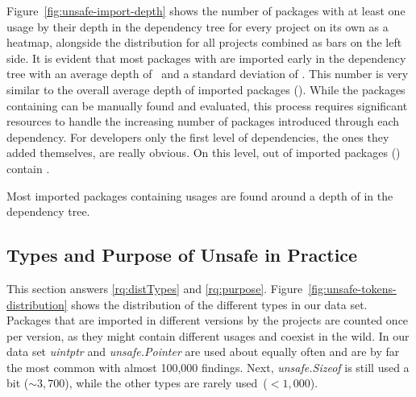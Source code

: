 Figure~\ref{fig:unsafe-import-depth} shows the number of packages with at least one \unsafe{} usage by their depth in the dependency tree for every project on its own as a heatmap, alongside the distribution for all projects combined as bars on the left side.
It is evident that most packages with \unsafe{} are imported early in the dependency tree with an average depth of \averageUnsafeImportDepth{}~and a standard deviation of \stdUnsafeImportDepth{}.
This number is very similar to the overall average depth of imported packages (\averageGeneralImportDepth{}). %
While the packages containing \unsafe{} can be manually found and evaluated, this process requires significant resources to handle the increasing number of packages introduced through each dependency. 
For developers only the first level of dependencies, the ones they added themselves, are really obvious.
On this level, \levelOneImportedUnsafePackagesCount{} out of \levelOneImportedPackagesCount{} imported packages (\levelOneImportedUnsafePackagesShare{}) contain \unsafe{}.

\begin{tcolorbox}[boxsep=1pt, enlarge top by=5pt, title=Answer to \ref{rq:depsDepth}]
Most imported packages containing \unsafe{} usages are found around a depth of  in the dependency tree.
\end{tcolorbox}




\subsection{Types and Purpose of Unsafe in Practice}
\label{sec:eval:labeledData}

This section answers \ref{rq:distTypes} and \ref{rq:purpose}.
%
Figure~\ref{fig:unsafe-tokens-distribution} shows the distribution of the different \unsafe{} types in our data set.
Packages that are imported in different versions by the projects are counted once per version, as they might contain different \unsafe{} usages and coexist in the wild.
In our data set \textit{uintptr} and \textit{unsafe.Pointer} are used about equally often and are by far the most common with almost 100,000 findings. 
Next, \textit{unsafe.Sizeof} is still used a bit ($\sim 3,700$), while the other \unsafe{} types are rarely used~($< 1,000$).

